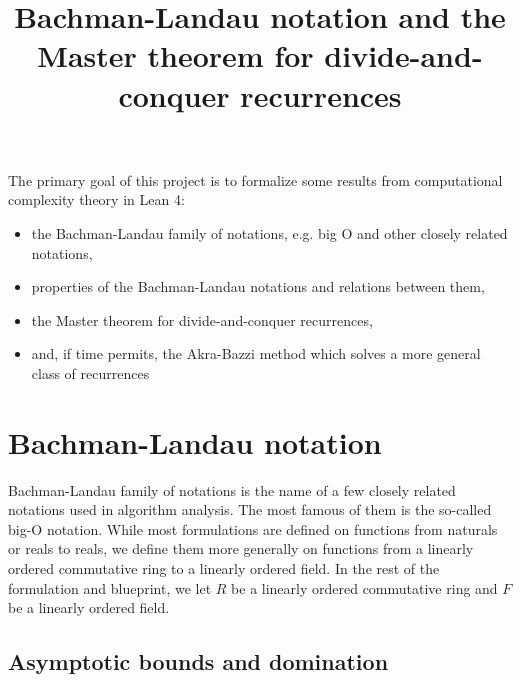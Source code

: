 %

\title{Bachman-Landau notation and the Master theorem for divide-and-conquer recurrences}

The primary goal of this project is to formalize some results from computational 
complexity theory in Lean 4:
\begin{itemize}
\item the Bachman-Landau family of notations, e.g. big O and other closely related notations,
\item properties of the Bachman-Landau notations and relations between them,
\item the Master theorem for divide-and-conquer recurrences,
\item and, if time permits, the Akra-Bazzi method which solves a more general class of recurrences
\end{itemize}

\section{Bachman-Landau notation}

Bachman-Landau family of notations is the name of a few closely related notations used in 
algorithm analysis. The most famous of them is the so-called big-O notation. While
most formulations are defined on functions from naturals or reals to reals, we define 
them more generally on functions from a linearly ordered commutative ring to a
linearly ordered field. In the rest of the formulation and blueprint, we let $R$ be
a linearly ordered commutative ring and $F$ be a linearly ordered field.

\subsection{Asymptotic bounds and domination}

